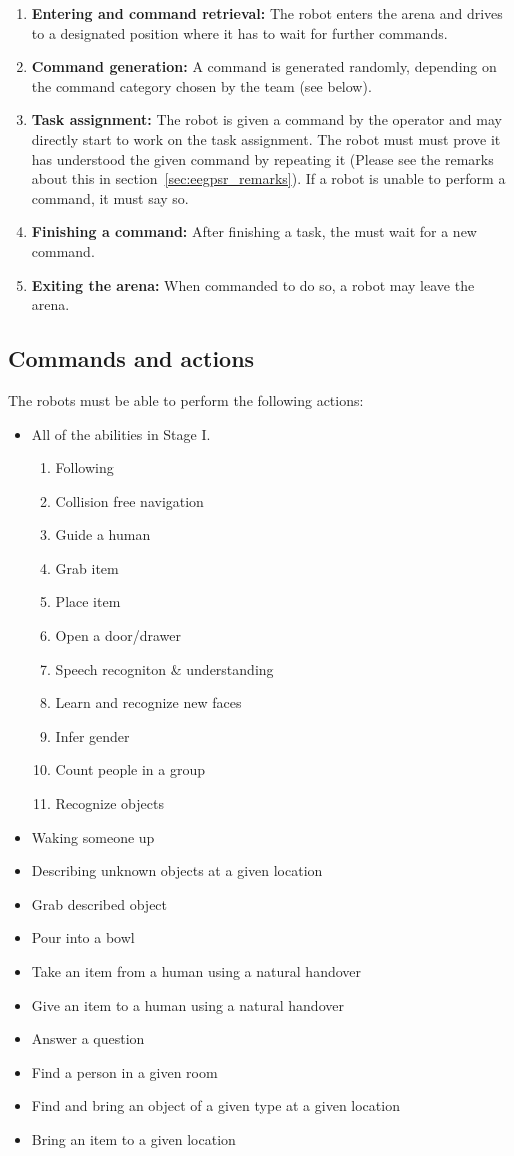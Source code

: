 \begin{enumerate}
	\item \textbf{Entering and command retrieval:} The robot enters the arena and drives to a designated position where it has to wait for further commands.
	\item \textbf{Command generation:} A command is generated randomly, depending on the command category chosen by the team (see below).
	\item \textbf{Task assignment:} The robot is given a command by the operator and may directly start to work on the task assignment. 
	The robot must must prove it has understood the given command by repeating it (Please see the remarks about this in section~\ref{sec:eegpsr_remarks}).
	If a robot is unable to perform a command, it must say so. 
	\item \textbf{Finishing a command:} After finishing a task, the must wait for a new command.
	\item \textbf{Exiting the arena:} When commanded to do so, a robot may leave the arena. 
\end{enumerate}

\subsection{Commands and actions}


The robots must be able to perform the following actions:
\begin{itemize}
 \item All of the abilities in Stage I.
  \begin{enumerate}
   \item Following
   \item Collision free navigation
   \item Guide a human
   \item Grab item
   \item Place item
   \item Open a door/drawer
   \item Speech recogniton & understanding
   \item Learn and recognize new faces
   \item Infer gender
   \item Count people in a group
   \item Recognize objects
  \end{enumerate}
 \item Waking someone up
 \item Describing unknown objects at a given location
 \item Grab described object
 \item Pour into a bowl
 \item Take an item from a human using a natural handover
 \item Give an item to a human using a natural handover
 \item Answer a question
 \item Find a person in a given room
 \item Find and bring an object of a given type at a given location
 \item Bring an item to a given location
\end{itemize}


